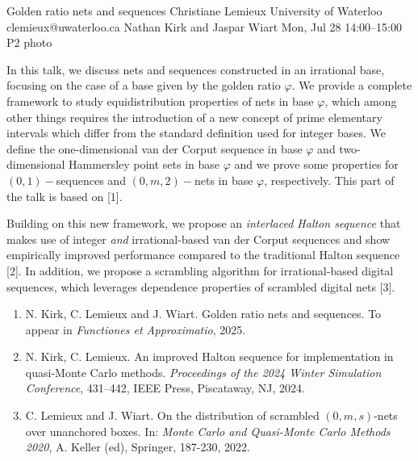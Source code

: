 \documentclass[12pt,lettersize,oneside]{book} %
\begin{document}
\clearpage
\begin{talk}
  {Golden ratio nets and sequences}%
  {Christiane Lemieux}%
  {University of Waterloo}%
  {clemieux@uwaterloo.ca}%
  {Nathan Kirk and Jaspar Wiart}%
  {}%
  {Mon, Jul 28 14:00--15:00}%
  {P2}%
  {photo}%
  
    
   

In this talk, we discuss nets and sequences constructed in an irrational base, focusing on the case of a base given by the golden ratio $\varphi$. We provide a complete framework to study equidistribution properties of nets in base $\varphi$, which among other things requires the introduction of a new concept of prime elementary intervals which differ from the standard definition used for integer bases. We define the one-dimensional van der Corput sequence in base $\varphi$ and two-dimensional Hammersley point sets in base $\varphi$ and we prove some properties for $(0,1)-$sequences and $(0,m,2)-$nets in base $\varphi$, respectively. This part of the talk is based on [1].


Building on this new framework, we propose 
an {\em interlaced Halton sequence} that makes use of integer \textit{and} irrational-based van der Corput sequences and show empirically improved performance compared to the traditional Halton sequence [2]. In addition, we propose a scrambling algorithm for irrational-based digital sequences, which leverages dependence properties of scrambled digital nets [3].

\medskip

\begin{enumerate}
 \item[{[1]}] N. Kirk, C. Lemieux and J. Wiart. Golden ratio nets and sequences. To appear in {\em Functiones et Approximatio}, 2025.
 \item[{[2]}] N. Kirk, C. Lemieux. An improved Halton sequence for implementation in quasi-Monte Carlo methods. {\em Proceedings of the 2024 Winter Simulation Conference}, 431--442, IEEE Press, Piscataway, NJ, 2024. 
    \item[{[3]}] C. Lemieux and J. Wiart. On the distribution of scrambled $(0, m, s)$-nets over unanchored
boxes. In: {\em Monte Carlo and Quasi-Monte Carlo Methods 2020}, A. Keller (ed), 
Springer, 187-230, 2022.
\end{enumerate}

\end{talk}
\end{document}
